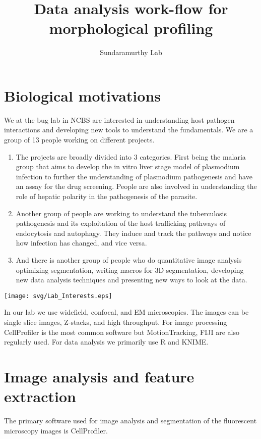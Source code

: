 \documentclass[12pt]{article}
\title{Data analysis work-flow for morphological profiling}
\author{Sundaramurthy Lab}
\begin{document}
\maketitle



\section{Biological motivations}
We at the bug lab in NCBS are interested in understanding host pathogen interactions and developing new tools to understand the fundamentals. We are a group of 13 people working on different projects. 
\begin{enumerate}
	\item The projects are broadly divided into 3 categories. First being the malaria group that aims to develop the in vitro liver stage model of plasmodium infection to further the understanding of plasmodium pathogenesis and have an assay for the drug screening.
	People are also involved in understanding the role of hepatic polarity in the pathogenesis of the parasite. 
	\item Another group of people are working to understand the tuberculosis pathogenesis and its exploitation of the host trafficking pathways of endocytosis and autophagy. They induce and track the pathways and notice how infection has changed, and vice versa. 
	\item And there is another group of people who do quantitative image analysis optimizing segmentation, writing macros for 3D segmentation, developing new data analysis techniques and presenting new ways to look at the data.
\end{enumerate}

	\begin{center} \texttt{[image: svg/Lab\_Interests.eps]} \end{center}

In our lab we use widefield, confocal, and EM microscopies. The images can be single slice images, Z-stacks, and high throughput. For image processing CellProfiler is the most common software but MotionTracking, FIJI are also regularly used. For data analysis we primarily use R and KNIME. 


\section{Image analysis and feature extraction}
The primary software used for image analysis and segmentation of the fluorescent microscopy images is CellProfiler. 
\end{document}
